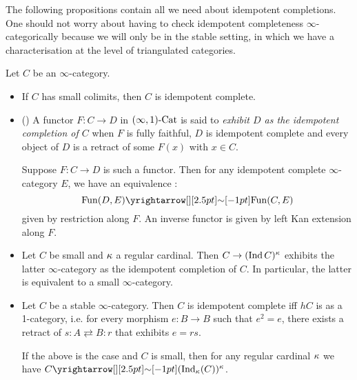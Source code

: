\documentclass[./main.tex]{subfiles}
\begin{document}
The following propositions contain all we need about idempotent completions.
One should not worry about having to check idempotent completeness
$\infty$-categorically because we will only be in the stable setting,
in which we have a characterisation at the level of triangulated categories.
\begin{prop}

  Let $C$ be an $\infty$-category.
  \begin{itemize}
    \item If $C$ has small colimits, then $C$ is idempotent complete.
    \item (\cite[Def 5.1.4.1, Prop 5.1.4.9, Lem 5.1.4.7]{Lurie-HTT})
    A functor $F : C \to D$ in $(\infty,1)\text{-}\mathrm{Cat}$ is said to
    \emph{exhibit $D$ as the idempotent completion of $C$} when 
    $F$ is fully faithful, $D$ is idempotent complete and every
    object of $D$ is a retract of some $F(x)$ with $x \in C$.

    Suppose $F : C \to D$ is such a functor.
    Then for any idempotent complete $\infty$-category $E$,
    we have an equivalence : 
    \[
      \FUN(D , E) \map{\sim}{} \FUN(C , E)
    \]
    given by restriction along $F$.
    An inverse functor is given by left Kan extension along $F$.
    \item \cite[Prop 5.4.2.4]{Lurie-HTT} 
    Let $C$ be small and $\kappa$ a regular cardinal.
    Then $C \to (\mathrm{Ind}\,C)^\kappa$ exhibits the latter $\infty$-category as
    the idempotent completion of $C$.
    In particular, the latter is equivalent to a small $\infty$-category.
    \item \cite[Prop 1.2.4.6]{Lurie-HA} Let $C$ be a stable $\infty$-category.
    Then $C$ is idempotent complete iff $hC$ is as a 1-category,
    i.e. for every morphism $e : B \to B$ such that $e^2 = e$,
    there exists a retract of $s : A \rightleftarrows B : r$
    that exhibits $e = r s$.

    If the above is the case and $C$ is small,
    then for any regular cardinal $\kappa$ we have
    $C \map{\sim}{} (\IND_\ka(C))^\ka$.
  \end{itemize}
\end{prop}
\end{document}
